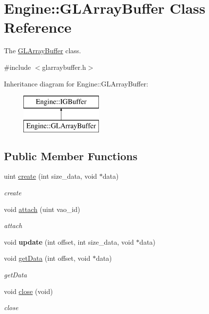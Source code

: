 \hypertarget{classEngine_1_1GLArrayBuffer}{}\section{Engine\+:\+:G\+L\+Array\+Buffer Class Reference}
\label{classEngine_1_1GLArrayBuffer}


The \hyperlink{classEngine_1_1GLArrayBuffer}{G\+L\+Array\+Buffer} class.  




{\ttfamily \#include $<$glarraybuffer.\+h$>$}

Inheritance diagram for Engine\+:\+:G\+L\+Array\+Buffer\+:\begin{figure}[H]
\begin{center}
\leavevmode
\includegraphics[height=2.000000cm]{classEngine_1_1GLArrayBuffer}
\end{center}
\end{figure}
\subsection*{Public Member Functions}
\begin{DoxyCompactItemize}
\item 
uint \hyperlink{classEngine_1_1GLArrayBuffer_aec618c4096d7b6d2ab39dde5fb55976b}{create} (int size\+\_\+data, void $\ast$data)
\begin{DoxyCompactList}\small\item\em create \end{DoxyCompactList}\item 
void \hyperlink{classEngine_1_1GLArrayBuffer_a5c31588067f1f10c0c9f35aedd8b73af}{attach} (uint vao\+\_\+id)
\begin{DoxyCompactList}\small\item\em attach \end{DoxyCompactList}\item 
\hypertarget{classEngine_1_1GLArrayBuffer_a9b15814cef2ea5ba9021c7637109cf07}{}void {\bfseries update} (int offset, int size\+\_\+data, void $\ast$data)\label{classEngine_1_1GLArrayBuffer_a9b15814cef2ea5ba9021c7637109cf07}

\item 
void \hyperlink{classEngine_1_1GLArrayBuffer_a6ca4905a31d11d291df25abbfe95f177}{get\+Data} (int offset, void $\ast$data)
\begin{DoxyCompactList}\small\item\em get\+Data \end{DoxyCompactList}\item 
void \hyperlink{classEngine_1_1GLArrayBuffer_aa6e0bd973444f5c23bf94fdc88e2e5ca}{close} (void)
\begin{DoxyCompactList}\small\item\em close \end{DoxyCompactList}\end{DoxyCompactItemize}

